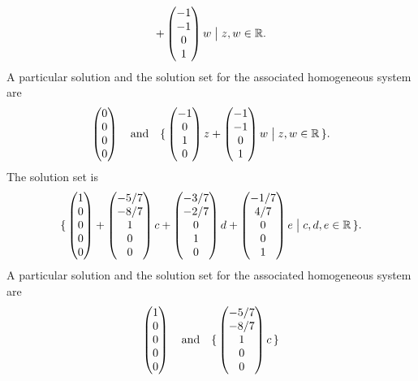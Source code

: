 \begin{exercises}
\begin{answer}
\begin{exparts}
\begin{equation*}
{               +\begin{pmatrix} -1 \\ -1 \\ 0 \\ 1 \end{pmatrix}w
              \bigm|z,w\in\mathbb{R}}.
        \end{equation*}
        A particular solution and the solution set for the associated
        homogeneous system are
        \begin{equation*}
          \begin{pmatrix} 0 \\ 0 \\ 0 \\ 0 \end{pmatrix}
            \quad\text{and}\quad
          \mbox{$\{\,\begin{pmatrix} -1 \\ 0 \\ 1 \\ 0 \end{pmatrix}z
               +\begin{pmatrix} -1 \\ -1 \\ 0 \\ 1 \end{pmatrix}w
              \bigm| z,w\in\mathbb{R}\,\}$}.
        \end{equation*}
      \partsitem
        The solution set is
        \begin{equation*}
          \mbox{$\{\,\begin{pmatrix} 1 \\ 0 \\ 0 \\ 0 \\ 0 \end{pmatrix}
               +\begin{pmatrix} -5/7 \\ -8/7 \\ 1 \\ 0 \\ 0 \end{pmatrix}c
               +\begin{pmatrix} -3/7 \\ -2/7 \\ 0 \\ 1 \\ 0 \end{pmatrix}d
               +\begin{pmatrix} -1/7 \\ 4/7 \\ 0 \\ 0 \\ 1 \end{pmatrix}e
              \bigm| c,d,e\in\mathbb{R}\,\}$}.
        \end{equation*}
        A particular solution and the solution set for the associated
        homogeneous system are
        \begin{equation*}
          \begin{pmatrix} 1 \\ 0 \\ 0 \\ 0 \\ 0 \end{pmatrix}
            \quad\text{and}\quad
          \mbox{$\{\,\begin{pmatrix} -5/7 \\ -8/7 \\ 1 \\ 0 \\ 0 \end{pmatrix}c
\,\}$}
\end{equation*}
\end{exparts}
\end{answer}
\end{exercises}

